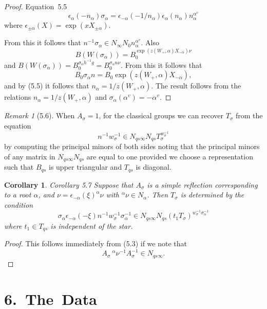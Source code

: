 \documentclass{memo-l}
\newtheorem{corollary}[theorem]{Corollary}
\theoremstyle{definition}
\theoremstyle{remark}
\newtheorem{remark}[theorem]{Remark}
\numberwithin{section}{chapter}
\numberwithin{equation}{chapter}
\begin{document}
\begin{proof}
{Equation\ 5.5} $$\epsilon_\alpha(-n_{{\alpha}})
{\sigma}_{{\alpha}} = {\epsilon}_{-{\alpha}}(-1/n_{{\alpha}})
{\epsilon}_{{\alpha}}(n_{{\alpha}})n_{{\alpha}}^{\alpha^v}$$
where $\epsilon_{\pm\alpha}(X) = \exp(x X_{\pm\alpha})$.
\enddefinition

\noindent
From this it follows that $n^{-1}{\sigma}_{{\alpha}} \in
N_{{\infty}}N_{0}n_{{\alpha}}^{\alpha^v}.$  Also
$$
B(W({\sigma}_{{\alpha}})) = B_{0}^{\exp(z(W_{+},{\alpha})X_{-{\alpha}})\nu}
$$
and $B(W({\sigma}_{{\alpha}})) = B_{0}^{\sigma_\alpha h^{-1}g}
= B_{0}^{\sigma_\alpha n{\nu}}.$  From this it follows that
$$
B_{0}{\sigma}_{{\alpha}}n = B_{0}\exp(z(W_{+},{\alpha})X_{-{\alpha}}) ,
$$
and by (5.5) it follows that $n_{{\alpha}} = 1/z(W_{+},{\alpha})$.
 The result follows from the relations $n_{{\alpha}} = 1/z(W_{+},{\alpha})$
and ${\sigma}_{{\alpha}}({\alpha}^{v}) = -{\alpha}^{v}$.
\end{proof} 

\begin{remark}[5.6]    When $A_{{\sigma}} = 1$, for the classical
groups we can recover $T_{{\sigma}}$ from the equation $$n^{-1}w_{{\sigma}}^{-1}
\in N_{qs{\infty}}N_{qs}T_{{\sigma}}^{w_\sigma^{-1}}$$  by computing
the principal minors of both sides noting that the principal minors of any
matrix in $N_{qs{\infty}}N_{qs}$ are equal to one provided we choose a
representation such that $B_{qs}$ is upper triangular and $T_{qs}$ is diagonal.
\end{remark}

\begin{corollary}{Corollary 5.7}    Suppose that $A_{{\sigma}}$ is a simple reflection
corresponding to a root ${\alpha}$, and ${\nu} =
{\epsilon}_{-{\alpha}}({\xi})^{{\alpha}}{\nu}$ with $^{{\alpha}}{\nu} \in
N_{{\alpha}}$.
 Then $T_{{\sigma}}$ is determined by the condition
$$
\sigma_{{\alpha}}{\epsilon}_{-{\alpha}}(-{\xi})n^{-1}w_{{\sigma}}^{-1}
{\sigma}_{{\alpha}}^{-1} \in
N_{qs{\infty}}N_{qs}(t_{1}T_{{\sigma}})^{w_\sigma^{-1}{\sigma}_{{\alpha}}^{-1}}
$$
where $t_{1} \in T_{qs}$ is independent of the star.
\end{corollary}

\begin{proof}   This follows immediately from (5.3) if we note that
$$A_{{\sigma}}\ {}^{{\alpha}}{\nu}^{-1}A_{{\sigma}}^{-1} \in N_{qs{\infty}}.$$
\end{proof} 


\section{{6.\  The\ Data}}
\end{document}
